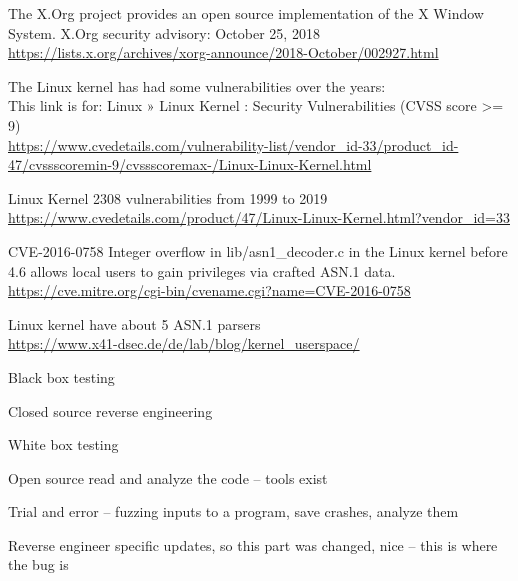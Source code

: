 \documentclass[Screen16to9,17pt]{foils}
\begin{document}
\begin{list2}
\item The X.Org project provides an open source implementation of the X Window System. X.Org security advisory: October 25, 2018
\url{https://lists.x.org/archives/xorg-announce/2018-October/002927.html}

\end{list2}



The Linux kernel has had some vulnerabilities over the years:\\
This link is for: Linux » Linux Kernel : Security Vulnerabilities (CVSS score >= 9)\\

{\footnotesize\url{https://www.cvedetails.com/vulnerability-list/vendor_id-33/product_id-47/cvssscoremin-9/cvssscoremax-/Linux-Linux-Kernel.html}}

Linux Kernel 2308 vulnerabilities from 1999 to 2019\\
\url{https://www.cvedetails.com/product/47/Linux-Linux-Kernel.html?vendor_id=33}


\begin{list2}
\item CVE-2016-0758 Integer overflow in lib/asn1\_decoder.c in the Linux kernel before 4.6 allows local users to gain privileges via crafted ASN.1 data.\\
\url{https://cve.mitre.org/cgi-bin/cvename.cgi?name=CVE-2016-0758}
\item Linux kernel have about 5 ASN.1 parsers\\
\url{https://www.x41-dsec.de/de/lab/blog/kernel_userspace/}
\end{list2}




\begin{list1}
\item Black box testing
\item Closed source reverse engineering
\item White box testing
\item Open source read and analyze the code -- tools exist
\item Trial and error -- fuzzing inputs to a program, save crashes, analyze them
\item Reverse engineer specific updates, so this part was changed, nice -- this is where the bug is
\end{list1}
\end{document}
